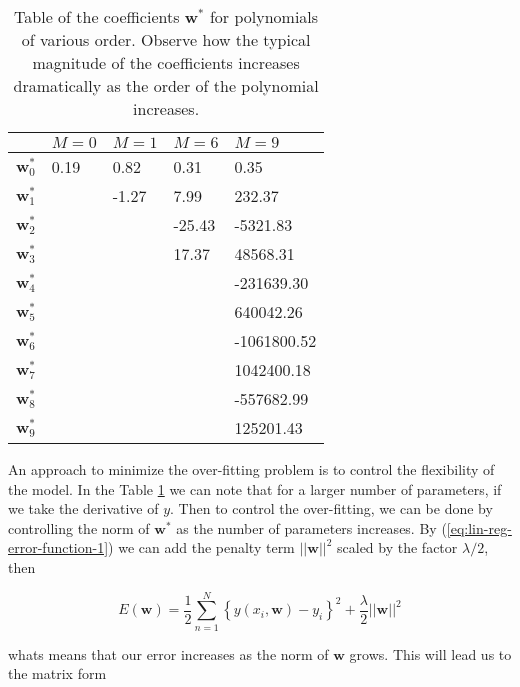 \documentclass[11pt]{article} %
\begin{document}
\begin{table}[h]
   \centering
   \begin{tabular}{l| l l l l}
     & $M=0$ & $M=1$ & $M=6$ & $M=9$ \\
   \hline
   $\mathbf{w}_0^*$ & 0.19 & 0.82   & 0.31   & 0.35\\
   $\mathbf{w}_1^*$ &      & -1.27  & 7.99   & 232.37\\
   $\mathbf{w}_2^*$ &      &        & -25.43 & -5321.83\\
   $\mathbf{w}_3^*$ &      &        & 17.37  & 48568.31\\
   $\mathbf{w}_4^*$ &      &        &        & -231639.30\\
   $\mathbf{w}_5^*$ &      &        &        & 640042.26\\
   $\mathbf{w}_6^*$ &      &        &        & -1061800.52\\
   $\mathbf{w}_7^*$ &      &        &        & 1042400.18\\
   $\mathbf{w}_8^*$ &      &        &        & -557682.99\\
   $\mathbf{w}_9^*$ &      &        &        & 125201.43\\
   \end{tabular}
   \caption{Table of the coefficients $\mathbf{w}^*$ for polynomials of various order. Observe how the typical magnitude of the coefficients increases dramatically as the order of the polynomial increases.}
   \label{tab:reg-lin-reg-weights}
   \end{table}

An approach to minimize the over-fitting problem is to control the flexibility of the model. In the Table \ref{tab:reg-lin-reg-weights} we can note that for a larger number of parameters, if we take the derivative of $y$. Then to control the over-fitting, we can be done by controlling the norm of $\mathbf{w}^*$ as the number of parameters increases. By (\ref{eq:lin-reg-error-function-1}) we can add the penalty term $||\mathbf{w}||^2 $ scaled by the factor $\lambda / 2$, then

\begin{equation}
   \label{eq:lin-reg-error-function-regularized}
   E(\mathbf{w}) = \frac{1}{2} \sum_{n=1}^N \left\{ y(x_i,\mathbf{w})-y_i \right\}^2 + \frac{\lambda}{2} ||\mathbf{w}||^2
\end{equation}

whats means that our error increases as the norm of $\mathbf{w}$ grows. This will lead us to the matrix form
\end{document}
